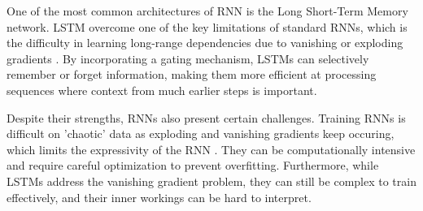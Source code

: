 One of the most common architectures of RNN is the Long Short-Term Memory network. LSTM overcome one of the key limitations of standard RNNs, which is the difficulty in learning long-range dependencies due to vanishing or exploding gradients \parencite{DiPietro2020}. By incorporating a gating mechanism, LSTMs can selectively remember or forget information, making them more efficient at processing sequences where context from much earlier steps is important.

Despite their strengths, RNNs also present certain challenges. Training RNNs is difficult on 'chaotic' data as exploding and vanishing gradients keep occuring, which limits the expressivity of the RNN \parencite{Mikhaeil2021OnTD}. They can be computationally intensive and require careful optimization to prevent overfitting. Furthermore, while LSTMs address the vanishing gradient problem, they can still be complex to train effectively, and their inner workings can be hard to interpret.\\